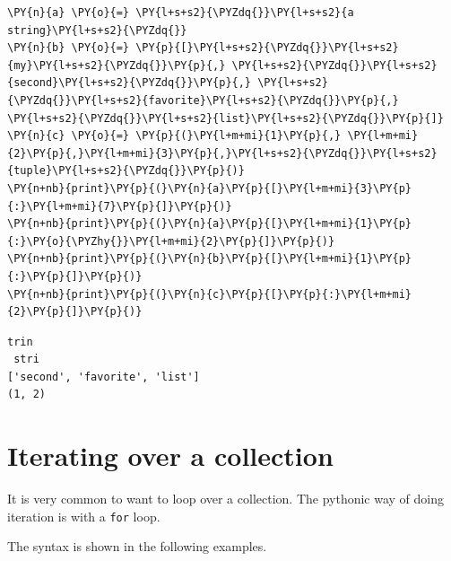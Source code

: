 \begin{Verbatim}[commandchars=\\\{\}]
\PY{n}{a} \PY{o}{=} \PY{l+s+s2}{\PYZdq{}}\PY{l+s+s2}{a string}\PY{l+s+s2}{\PYZdq{}}
\PY{n}{b} \PY{o}{=} \PY{p}{[}\PY{l+s+s2}{\PYZdq{}}\PY{l+s+s2}{my}\PY{l+s+s2}{\PYZdq{}}\PY{p}{,} \PY{l+s+s2}{\PYZdq{}}\PY{l+s+s2}{second}\PY{l+s+s2}{\PYZdq{}}\PY{p}{,} \PY{l+s+s2}{\PYZdq{}}\PY{l+s+s2}{favorite}\PY{l+s+s2}{\PYZdq{}}\PY{p}{,} \PY{l+s+s2}{\PYZdq{}}\PY{l+s+s2}{list}\PY{l+s+s2}{\PYZdq{}}\PY{p}{]}
\PY{n}{c} \PY{o}{=} \PY{p}{(}\PY{l+m+mi}{1}\PY{p}{,} \PY{l+m+mi}{2}\PY{p}{,}\PY{l+m+mi}{3}\PY{p}{,}\PY{l+s+s2}{\PYZdq{}}\PY{l+s+s2}{tuple}\PY{l+s+s2}{\PYZdq{}}\PY{p}{)}
\PY{n+nb}{print}\PY{p}{(}\PY{n}{a}\PY{p}{[}\PY{l+m+mi}{3}\PY{p}{:}\PY{l+m+mi}{7}\PY{p}{]}\PY{p}{)}
\PY{n+nb}{print}\PY{p}{(}\PY{n}{a}\PY{p}{[}\PY{l+m+mi}{1}\PY{p}{:}\PY{o}{\PYZhy{}}\PY{l+m+mi}{2}\PY{p}{]}\PY{p}{)}
\PY{n+nb}{print}\PY{p}{(}\PY{n}{b}\PY{p}{[}\PY{l+m+mi}{1}\PY{p}{:}\PY{p}{]}\PY{p}{)}
\PY{n+nb}{print}\PY{p}{(}\PY{n}{c}\PY{p}{[}\PY{p}{:}\PY{l+m+mi}{2}\PY{p}{]}\PY{p}{)}
\end{Verbatim}

\begin{Verbatim}
trin
 stri
['second', 'favorite', 'list']
(1, 2)

\end{Verbatim}

\section{Iterating over a collection}


It is very common to want to loop over a collection.
The pythonic way of doing iteration is with a \texttt{for} loop.


The syntax is shown in the following examples.

